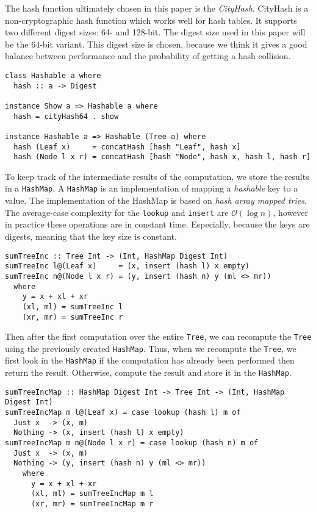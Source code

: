 The hash function ultimately chosen in this paper is the \textit{CityHash}\cite{hackage2022cityhash}. CityHash is a non-cryptographic hash function which works well for hash tables\cite{google2022cityhash}. It supports two different digest sizes: 64- and 128-bit. The digest size used in this paper will be the 64-bit variant. This digest size is chosen, because we think it gives a good balance between performance and the probability of getting a hash collision.

\begin{verbatim}
class Hashable a where
  hash :: a -> Digest

instance Show a => Hashable a where
  hash = cityHash64 . show

instance Hashable a => Hashable (Tree a) where
  hash (Leaf x)     = concatHash [hash "Leaf", hash x]
  hash (Node l x r) = concatHash [hash "Node", hash x, hash l, hash r]
\end{verbatim}

To keep track of the intermediate results of the computation, we store the results in a \texttt{HashMap}\cite{hackage2022hashmap}. A \texttt{HashMap} is an implementation of mapping a \textit{hashable} key to a value. The implementation of the HashMap is based on \textit{hash array mapped tries}\cite*{bagwell2001ideal}. The average-case complexity for the \texttt{lookup} and \texttt{insert} are $\mathcal{O}(\log{n})$, however in practice these operations are in constant time. Especially, because the keys are digests, meaning that the key size is constant.

\begin{verbatim}
sumTreeInc :: Tree Int -> (Int, HashMap Digest Int)
sumTreeInc l@(Leaf x)     = (x, insert (hash l) x empty)
sumTreeInc n@(Node l x r) = (y, insert (hash n) y (ml <> mr))
  where
    y = x + xl + xr
    (xl, ml) = sumTreeInc l
    (xr, mr) = sumTreeInc r
\end{verbatim}

Then after the first computation over the entire \texttt{Tree}, we can recompute the \texttt{Tree} using the previously created \texttt{HashMap}. Thus, when we recompute the \texttt{Tree}, we first look in the \texttt{HashMap} if the computation has already been performed then return the result. Otherwise, compute the result and store it in the \texttt{HashMap}.

\begin{verbatim}
sumTreeIncMap :: HashMap Digest Int -> Tree Int -> (Int, HashMap Digest Int)
sumTreeIncMap m l@(Leaf x) = case lookup (hash l) m of
  Just x  -> (x, m) 
  Nothing -> (x, insert (hash l) x empty)
sumTreeIncMap m n@(Node l x r) = case lookup (hash n) m of
  Just x  -> (x, m)
  Nothing -> (y, insert (hash n) y (ml <> mr))
    where
      y = x + xl + xr
      (xl, ml) = sumTreeIncMap m l
      (xr, mr) = sumTreeIncMap m r
\end{verbatim}


